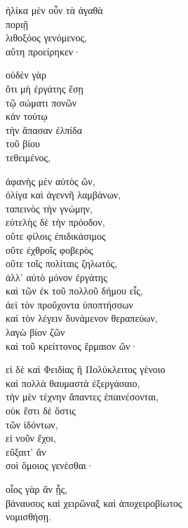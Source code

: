 {\large
\begin{greek}
\noindent ἡλίκα μὲν οὖν τὰ ἀγαθὰ \\
ποριῇ \\
\tabto{2em} λιθοξόος γενόμενος, \\
αὕτη προείρηκεν·

\tabto{2em} οὐδὲν γὰρ \\
\tabto{4em} ὅτι μὴ ἐργάτης ἔσῃ \\
\tabto{6em} τῷ σώματι πονῶν \\
\tabto{4em} κἀν τούτῳ \\
\tabto{4em} τὴν ἅπασαν ἐλπίδα \\
\tabto{6em} τοῦ βίου \\
\tabto{4em} τεθειμένος,

\tabto{4em} ἀφανὴς μὲν αὐτὸς ὤν,\\
\tabto{6em} ὀλίγα καὶ ἀγεννῆ λαμβάνων, \\
\tabto{6em} ταπεινὸς τὴν γνώμην, \\
\tabto{6em} εὐτελὴς δὲ τὴν πρόοδον, \\
\tabto{6em} οὔτε φίλοις ἐπιδικάσιμος\\
\tabto{6em} οὔτε ἐχθροῖς φοβερὸς \\
\tabto{6em} οὔτε τοῖς πολίταις ζηλωτός, \\
\tabto{6em} ἀλλ' αὐτὸ μόνον ἐργάτης \\
\tabto{8em} καὶ τῶν ἐκ τοῦ πολλοῦ δήμου εἷς, \\
\tabto{8em} ἀεὶ τὸν προὔχοντα ὑποπτήσσων \\
\tabto{8em} καὶ τὸν λέγειν δυνάμενον θεραπεύων, \\
\tabto{8em} λαγὼ βίον ζῶν \\
\tabto{8em} καὶ τοῦ κρείττονος ἕρμαιον ὤν·

\tabto{4em} εἰ δὲ καὶ Φειδίας ἢ Πολύκλειτος γένοιο \\
\tabto{6em} καὶ πολλὰ θαυμαστὰ ἐξεργάσαιο, \\
\tabto{4em} τὴν μὲν τέχνην ἅπαντες ἐπαινέσονται, \\
\tabto{4em} οὐκ ἔστι δὲ ὅστις \\
\tabto{6em} τῶν ἰδόντων, \\
\tabto{8em} εἰ νοῦν ἔχοι, \\
\tabto{4em} εὔξαιτ' ἂν \\
\tabto{6em} σοὶ ὅμοιος γενέσθαι·

\noindent οἷος γὰρ ἂν ᾖς, \\
\tabto{2em} βάναυσος καὶ χειρῶναξ καὶ ἀποχειροβίωτος \\
νομισθήσῃ.\\

\end{greek}
}

